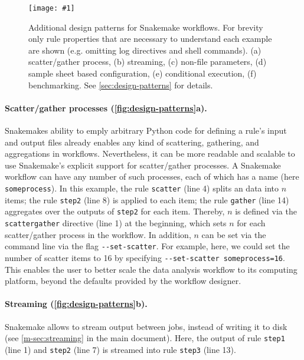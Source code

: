 \documentclass{scrartcl}
\newcommand{\image}[1]{\centering\texttt{[image: \#1]}}
\begin{document}
\begin{figure}
	\image{design-patterns.pdf}
	\caption{Additional design patterns for Snakemake workflows.
		For brevity only rule properties that are necessary to understand each example are shown (e.g. omitting log directives and shell commands).
		(a) scatter/gather process, (b) streaming, (c) non-file parameters, (d) sample sheet based configuration, (e) conditional execution, (f) benchmarking.
		See \autoref{sec:design-patterns} for details.
	}\label{fig:design-patterns}
\end{figure}

\paragraph{Scatter/gather processes (\autoref{fig:design-patterns}a).}
Snakemakes ability to emply arbitrary Python code for defining a rule's input and output files already enables any kind of scattering, gathering, and aggregations in workflows.
Nevertheless, it can be more readable and scalable to use Snakemake's explicit support for scatter/gather processes.
A Snakemake workflow can have any number of such processes, each of which has a name (here \lstinline!someprocess!).
In this example, the rule \lstinline!scatter! (line 4) splits an data into $n$ items; the rule \lstinline!step2! (line 8) is applied to each item; the rule \lstinline!gather! (line 14) aggregates over the outputs of \lstinline!step2! for each item.
Thereby, $n$ is defined via the \lstinline!scattergather! directive (line 1) at the beginning, which sets $n$ for each scatter/gather process in the workflow.
In addition, $n$ can be set via the command line via the flag \lstinline!--set-scatter!.
For example, here, we could set the number of scatter items to 16 by specifying \lstinline!--set-scatter someprocess=16!.
This enables the user to better scale the data analysis workflow to its computing platform, beyond the defaults provided by the workflow designer.

\paragraph{Streaming (\autoref{fig:design-patterns}b).}
Snakemake allows to stream output between jobs, instead of writing it to disk (see \autoref{m-sec:streaming} in the main document).
Here, the output of rule \lstinline!step1! (line 1) and \lstinline!step2! (line 7) is streamed into rule \lstinline!step3! (line 13).
\end{document}

